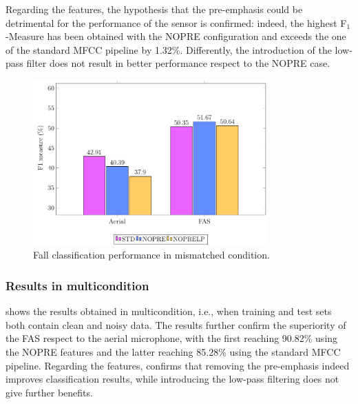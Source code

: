 Regarding the features, the hypothesis that the pre-emphasis could be detrimental for the performance of the sensor is confirmed: indeed, the highest F$_1$-Measure has been obtained with the NOPRE configuration and exceeds the one of the standard MFCC pipeline by 1.32\%. Differently, the introduction of the low-pass filter does not result in better performance respect to the NOPRE case. %

\begin{figure}[t]
	\centering
	\includegraphics[width=0.8\textwidth]{img/pgfsources/16_mismatched/16_mismatched}
	\caption{Fall classification performance in mismatched condition.} \label{fig:results_mismatch}
\end{figure}

\subsubsection{Results in multicondition}
 shows the results obtained in multicondition, i.e., when training and test sets both contain clean and noisy data. The results further confirm the superiority of the FAS respect to the aerial microphone, with the first reaching 90.82\% using the NOPRE features and the latter reaching 85.28\% using the standard MFCC pipeline. Regarding the features,  confirms that removing the pre-emphasis indeed improves classification results, while introducing the low-pass filtering does not give further benefits.

